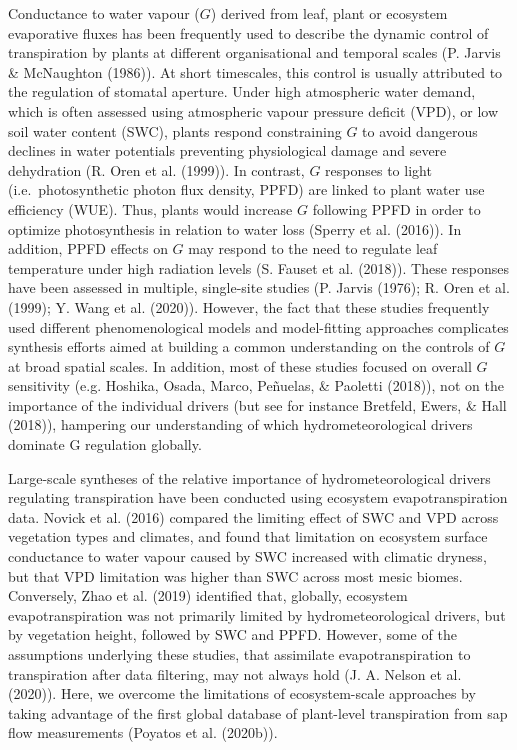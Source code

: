 \documentclass[11pt,twoside]{reedthesis}
\begin{document}
Conductance to water vapour (\(G\)) derived from leaf, plant or
ecosystem evaporative fluxes has been frequently used to describe the
dynamic control of transpiration by plants at different organisational
and temporal scales (P. Jarvis \& McNaughton (1986)). At short
timescales, this control is usually attributed to the regulation of
stomatal aperture. Under high atmospheric water demand, which is often
assessed using atmospheric vapour pressure deficit (VPD), or low soil
water content (SWC), plants respond constraining \(G\) to avoid
dangerous declines in water potentials preventing physiological damage
and severe dehydration (R. Oren et al. (1999)). In contrast, \(G\)
responses to light (i.e.~photosynthetic photon flux density, PPFD) are
linked to plant water use efficiency (WUE). Thus, plants would increase
\(G\) following PPFD in order to optimize photosynthesis in relation to
water loss (Sperry et al. (2016)). In addition, PPFD effects on \(G\)
may respond to the need to regulate leaf temperature under high
radiation levels (S. Fauset et al. (2018)). These responses have been
assessed in multiple, single-site studies (P. Jarvis (1976); R. Oren et
al. (1999); Y. Wang et al. (2020)). However, the fact that these studies
frequently used different phenomenological models and model-fitting
approaches complicates synthesis efforts aimed at building a common
understanding on the controls of \(G\) at broad spatial scales. In
addition, most of these studies focused on overall \(G\) sensitivity
(e.g. Hoshika, Osada, Marco, Peñuelas, \& Paoletti (2018)), not on the
importance of the individual drivers (but see for instance Bretfeld,
Ewers, \& Hall (2018)), hampering our understanding of which
hydrometeorological drivers dominate G regulation globally.\par

Large-scale syntheses of the relative importance of hydrometeorological
drivers regulating transpiration have been conducted using ecosystem
evapotranspiration data. Novick et al. (2016) compared the limiting
effect of SWC and VPD across vegetation types and climates, and found
that limitation on ecosystem surface conductance to water vapour caused
by SWC increased with climatic dryness, but that VPD limitation was
higher than SWC across most mesic biomes. Conversely, Zhao et al. (2019)
identified that, globally, ecosystem evapotranspiration was not
primarily limited by hydrometeorological drivers, but by vegetation
height, followed by SWC and PPFD. However, some of the assumptions
underlying these studies, that assimilate evapotranspiration to
transpiration after data filtering, may not always hold (J. A. Nelson et
al. (2020)). Here, we overcome the limitations of ecosystem-scale
approaches by taking advantage of the first global database of
plant-level transpiration from sap flow measurements (Poyatos et al.
(2020b)).\par
\end{document}
